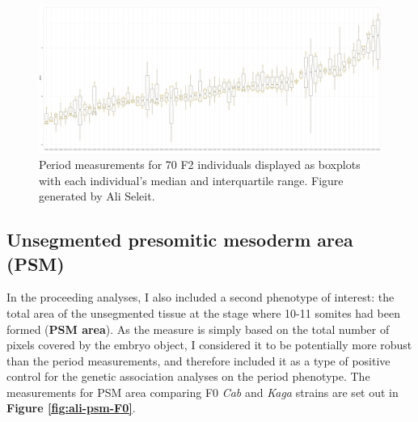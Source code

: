 \documentclass[
]{book}
\begin{document}
\begin{figure}
\includegraphics[width=1\linewidth]{figs/somites/ali_F2_mean_period} \caption{Period measurements for 70 F2 individuals displayed as boxplots with each individual's median and interquartile range. Figure generated by Ali Seleit.}\label{fig:ali-somite-period-box}
\end{figure}

\clearpage

\hypertarget{unsegmented-presomitic-mesoderm-area-psm}{%
\subsection{Unsegmented presomitic mesoderm area (PSM)}\label{unsegmented-presomitic-mesoderm-area-psm}}

In the proceeding analyses, I also included a second phenotype of interest: the total area of the unsegmented tissue at the stage where 10-11 somites had been formed (\textbf{PSM area}). As the measure is simply based on the total number of pixels covered by the embryo object, I considered it to be potentially more robust than the period measurements, and therefore included it as a type of positive control for the genetic association analyses on the period phenotype. The measurements for PSM area comparing F0 \emph{Cab} and \emph{Kaga} strains are set out in \textbf{Figure \ref{fig:ali-psm-F0}}.
\end{document}
